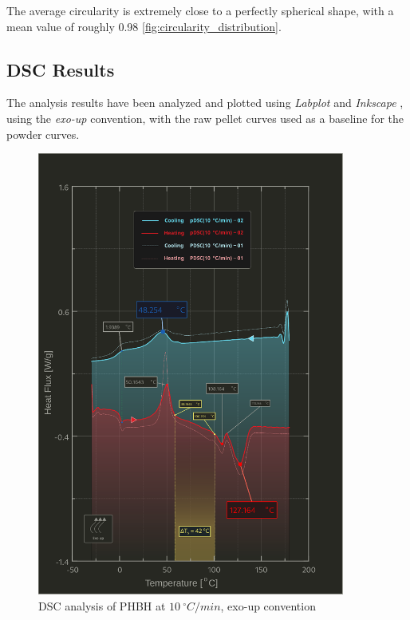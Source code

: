 \documentclass{article}
\begin{document}
      The average circularity is extremely close to a perfectly spherical shape, with a 
      mean value of roughly 0.98 \ref{fig:circularity_distribution}. \\ 

      \clearpage

    \subsection{DSC Results\label{DSC_results}}

    The analysis results have been analyzed and plotted using \textit{Labplot} \autocites{Labplot} 
    and \textit{Inkscape} \autocites{Inkscape},
    using the \textit{exo-up} convention, with the raw pellet curves used as a baseline for the powder curves. \\
        \begin{figure}[h!]
            \includegraphics[width=0.9\textwidth]{Pictures/Thermal_analysis_plots/DSC_alberto.eps}
            \caption{DSC analysis of PHBH at $10 \ ^{\circ}C/min$, exo-up convention}
            \label{fig:DSC_10Cmin}
        \end{figure}
\end{document}
